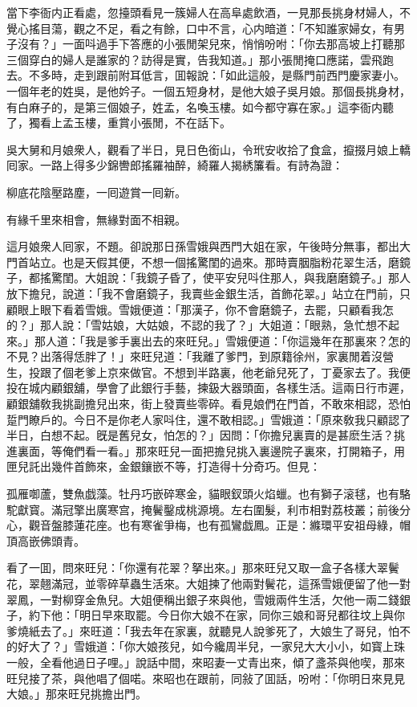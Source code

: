 當下李衙内正看處，忽擡頭看見一簇婦人在高阜處飲酒，一見那長挑身材婦人，不覺心搖目蕩，觀之不足，看之有餘，口中不言，心内暗道：「不知誰家婦女，有男子沒有？」一面呌過手下答應的小張閒架兒來，悄悄吩咐：「你去那高坡上打聽那三個穿白的婦人是誰家的？訪得是實，告我知道。」那小張閒掩口應諾，雲飛跑去。不多時，走到跟前附耳低言，囬報說：「如此這般，是縣門前西門慶家妻小。一個年老的姓吳，是他妗子。一個五短身材，是他大娘子吳月娘。那個長挑身材，有白麻子的，是第三個娘子，姓孟，名喚玉樓。如今都守寡在家。」這李衙内聽了，獨看上孟玉樓，重賞小張閒，不在話下。

吳大舅和月娘衆人，觀看了半日，見日色銜山，令玳安收拾了食盒，攛掇月娘上轎囘家。一路上得多少錦轡郎搖羅袖醉，綺羅人揭綉簾看。有詩為證：

\begin{myquote}
柳底花陰壓路塵，一囘遊賞一囘新。

有緣千里來相會，無緣對面不相親。
\end{myquote}

這月娘衆人囘家，不題。卻說那日孫雪娥與西門大姐在家，午後時分無事，都出大門首站立。也是天假其便，不想一個搖驚閨的過來。那時賣胭脂粉花翠生活，磨鏡子，都搖驚閨。大姐說：「我鏡子昏了，使平安兒呌住那人，與我磨磨鏡子。」那人放下擔兒，說道：「我不會磨鏡子，我賣些金銀生活，首飾花翠。」站立在門前，只顧眼上眼下看着雪娥。雪娥便道：「那漢子，你不會磨鏡子，去罷，只顧看我怎的？」那人說：「雪姑娘，大姑娘，不認的我了？」大姐道：「眼熟，急忙想不起來。」那人道：「我是爹手裏出去的來旺兒。」雪娥便道：「你這幾年在那裏來？怎的不見？出落得恁胖了！」來旺兒道：「我離了爹門，到原籍徐州，家裏閒着沒營生，投跟了個老爹上京來做官。不想到半路裏，他老爺兒死了，丁憂家去了。我便投在城内顧銀舖，學會了此銀行手藝，揀鈒大器頭面，各樣生活。這兩日行市遲，顧銀舖敎我挑副擔兒出來，街上發賣些零碎。看見娘們在門首，不敢來相認，恐怕踅門瞭戶的。今日不是你老人家呌住，還不敢相認。」雪娥道：「原來敎我只顧認了半日，白想不起。旣是舊兒女，怕怎的？」因問：「你擔兒裏賣的是甚麽生活？挑進裏面，等俺們看一看。」那來旺兒一面把擔兒挑入裏邊院子裏來，打開箱子，用匣兒託出幾件首飾來，金銀鑲嵌不等，打造得十分奇巧。但見：

\begin{myquote}
孤雁啣蘆，雙魚戯藻。牡丹巧嵌碎寒金，貓眼釵頭火焰蠟。也有獅子滚毬，也有駱駝獻寳。滿冠擎出廣寒宫，掩鬢鑿成桃源境。左右圍髮，利市相對荔枝叢；前後分心，觀音盤膝蓮花座。也有寒雀爭梅，也有孤鸞戯鳳。正是：縧環平安祖母綠，帽頂高嵌佛頭青。
\end{myquote}

看了一囬，問來旺兒：「你還有花翠？拏出來。」那來旺兒又取一盒子各樣大翠鬢花，翠翹滿冠，並零碎草蟲生活來。大姐揀了他兩對鬢花，這孫雪娥便留了他一對翠鳳，一對柳穿金魚兒。大姐便稱出銀子來與他，雪娥兩件生活，欠他一兩二錢銀子，約下他：「明日早來取罷。今日你大娘不在家，同你三娘和哥兒都往坟上與你爹燒紙去了。」來旺道：「我去年在家裏，就聽見人說爹死了，大娘生了哥兒，怕不的好大了？」雪娥道：「你大娘孩兒，如今纔周半兒，一家兒大大小小，如寳上珠一般，全看他過日子哩。」說話中間，來昭妻一丈青出來，傾了盞茶與他喫，那來旺兒接了茶，與他唱了個喏。來昭也在跟前，同敍了囬話，吩咐：「你明日來見見大娘。」那來旺兒挑擔出門。

